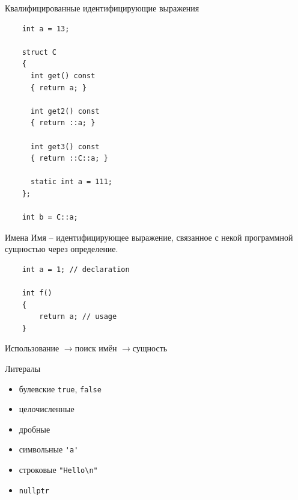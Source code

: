 \documentclass[unknownkeysallowed,xcolor=table]{beamer}
\newcommand{\rarr}{$\rightarrow$}
\begin{document}
\begin{frame}[fragile]{Квалифицированные идентифицирующие выражения}
  \begin{lstlisting}
    int a = 13;

    struct C
    {
      int get() const
      { return a; }

      int get2() const
      { return ::a; }

      int get3() const
      { return ::C::a; }

      static int a = 111;
    };

    int b = C::a;
  \end{lstlisting}
\end{frame}

\begin{frame}[fragile]{Имена}
  Имя -- идентифицирующее выражение, связанное с некой программной сущностью через определение. \vspace{2em}
  \begin{lstlisting}
    int a = 1; // declaration

    int f()
    {
        return a; // usage
    }
  \end{lstlisting}
  \vspace{2em}
  Использование \rarr поиск имён \rarr сущность
\end{frame}

\begin{frame}[fragile]{Литералы}
  \begin{itemize}
    \item булевские \lstinline{true}, \lstinline{false} \vspace{0.5em}
    \item целочисленные \vspace{0.5em}
    \item дробные \vspace{0.5em}
    \item символьные \lstinline{'a'} \vspace{0.5em}
    \item строковые \lstinline{"Hello\n"} \vspace{0.5em}
    \item \lstinline{nullptr}
  \end{itemize}
\end{frame}
\end{document}

